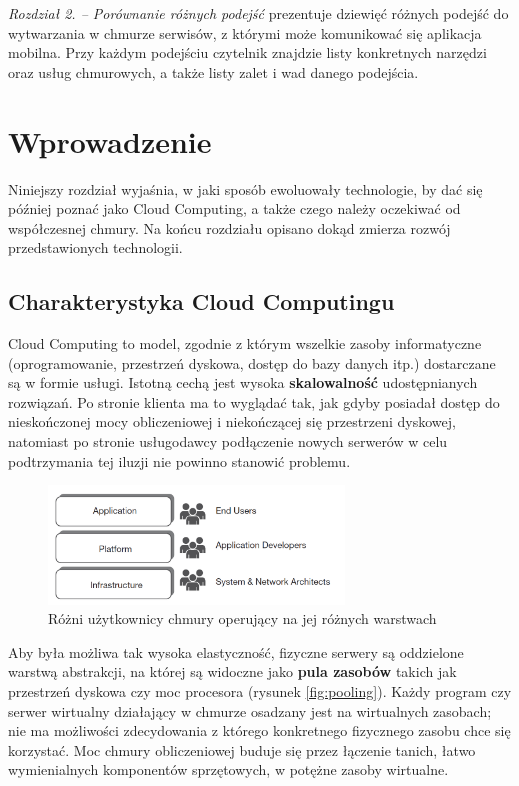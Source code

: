 \documentclass[12pt,a4paper,twoside,titlepage,openright]{book}
\begin{document}
\noindent
\textit{Rozdział 2. -- Porównanie różnych podejść} prezentuje dziewięć różnych podejść do wytwarzania w chmurze serwisów, z którymi może komunikować się aplikacja mobilna. Przy każdym podejściu czytelnik znajdzie listy konkretnych narzędzi oraz usług chmurowych, a także listy zalet i wad danego podejścia.


\clearpage{\pagestyle{empty}\cleardoublepage}
\chapter{Wprowadzenie}

Niniejszy rozdział wyjaśnia, w jaki sposób ewoluowały technologie, by dać się później poznać jako Cloud Computing, a także czego należy oczekiwać od współczesnej chmury. Na końcu rozdziału opisano dokąd zmierza rozwój przedstawionych technologii.



\section{Charakterystyka Cloud Computingu}

Cloud Computing to model, zgodnie z którym wszelkie zasoby informatyczne (oprogramowanie, przestrzeń dyskowa, dostęp do bazy danych itp.) dostarczane są w formie usługi. Istotną cechą jest wysoka \textbf{skalowalność} udostępnianych rozwiązań. Po stronie klienta ma to wyglądać tak, jak gdyby posiadał dostęp do nieskończonej mocy obliczeniowej i niekończącej się przestrzeni dyskowej, natomiast po stronie usługodawcy podłączenie nowych serwerów w celu podtrzymania tej iluzji nie powinno stanowić problemu. \cite{ccBiznes}

\begin{figure}[h]
	\centering
			\includegraphics[width=0.7\textwidth]{layers-and-users.png}
		\caption{Różni użytkownicy chmury operujący na jej różnych warstwach \cite{ccCambridge}}
		\label{fig:layers-and-users}
\end{figure}

Aby była możliwa tak wysoka elastyczność, fizyczne serwery są oddzielone warstwą abstrakcji, na której są widoczne jako \textbf{pula zasobów} takich jak przestrzeń dyskowa czy moc procesora (rysunek \ref{fig:pooling}). Każdy program czy serwer wirtualny działający w chmurze osadzany jest na wirtualnych zasobach; nie ma możliwości zdecydowania z którego konkretnego fizycznego zasobu chce się korzystać. Moc chmury obliczeniowej buduje się przez łączenie tanich, łatwo wymienialnych komponentów sprzętowych, w potężne zasoby wirtualne. \cite{ccCambridge}
\end{document}
